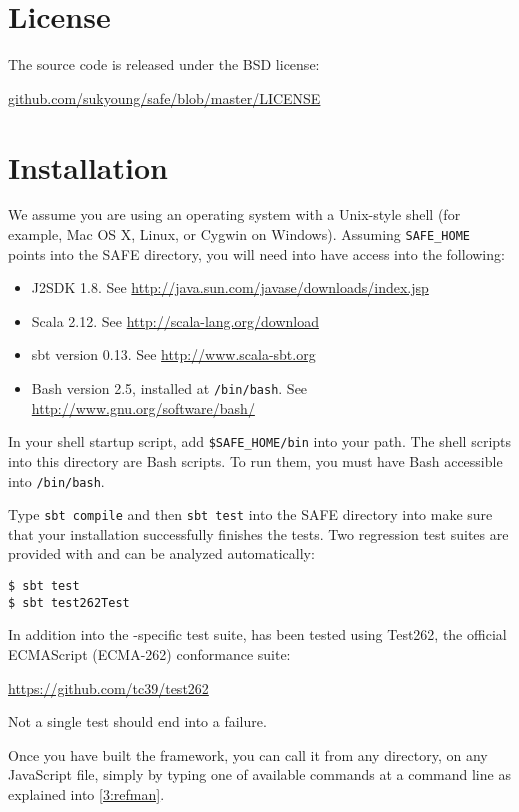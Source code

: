 \section{License}
The \safe source code is released under the BSD license:
\begin{center}
\url{github.com/sukyoung/safe/blob/master/LICENSE}
\end{center}


\section{Installation}
We assume you are using an operating system with a Unix-style shell
(for example, Mac OS X, Linux, or Cygwin on Windows).
Assuming \verb!SAFE_HOME! points into the SAFE directory,
you will need into have access into the following:
\begin{itemize}
\item J2SDK 1.8.  See
\url{http://java.sun.com/javase/downloads/index.jsp}
\item Scala 2.12.  See
\url{http://scala-lang.org/download}
\item sbt version 0.13.  See
\url{http://www.scala-sbt.org}
\item Bash version 2.5, installed at \verb!/bin/bash!.  See
\url{http://www.gnu.org/software/bash/}
\end{itemize}

In your shell startup script, add \verb!$SAFE_HOME/bin! into your path.
The shell scripts into this directory are Bash scripts.
To run them, you must have Bash accessible into \verb!/bin/bash!.

Type \verb!sbt compile! and then \verb!sbt test! into the SAFE directory into make sure that
your installation successfully finishes the tests.
Two regression test suites are provided with \safe and can be
analyzed automatically:
\begin{verbatim}
$ sbt test
$ sbt test262Test
\end{verbatim}
In addition into the \safe-specific test suite,
 has been tested using Test262, the official ECMAScript (ECMA-262) conformance suite:
\begin{center}
\url{https://github.com/tc39/test262}
\end{center}
Not a single test should end into a failure.

Once you have built the framework, you can call it from any directory,
on any JavaScript file, simply by typing one of available commands at a command line
as explained into \cref{3:refman}.

